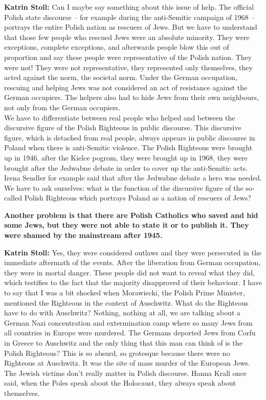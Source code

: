 \textbf{Katrin Stoll:} Can I maybe say something about this issue of help. The official Polish state discourse – for example during the anti-Semitic campaign of 1968 – portrays the entire Polish nation as rescuers of Jews. But we have to understand that those few people who rescued Jews were an absolute minority. They were exceptions, complete exceptions, and afterwards people blow this out of proportion and say these people were representative of the Polish nation. They were not! They were not representative, they represented only themselves, they acted against the norm, the societal norm. Under the German occupation, rescuing and helping Jews was not considered an act of resistance against the German occupiers. The helpers also had to hide Jews from their own neighbours, not only from the German occupiers.\\ 
We have to differentiate between real people who helped and between the discursive figure of the Polish Righteous in public discourse. This discursive figure, which is detached from real people, always appears in public discourse in Poland when there is anti-Semitic violence. The Polish Righteous were brought up in 1946, after the Kielce pogrom, they were brought up in 1968, they were brought after the Jedwabne debate in order to cover up the anti-Semitic acts. Irena Sendler for example said that after the Jedwabne debate a hero was needed. We have to ask ourselves: what is the function of the discursive figure of the so-called Polish Righteous which portrays Poland as a nation of rescuers of Jews? 

\textbf{Another problem is that there are Polish Catholics who saved and hid some Jews, but they were not able to state it or to publish it. They were shamed by the mainstream after 1945.} 

\textbf{Katrin Stoll:} Yes, they were considered outlaws and they were persecuted in the immediate aftermath of the events. After the liberation from German occupation, they were in mortal danger. These people did not want to reveal what they did, which testifies to the fact that the majority disapproved of their behaviour. I have to say that I was a bit shocked when Morawiecki, the Polish Prime Minister, mentioned the Righteous in the context of Auschwitz. What do the Righteous have to do with Auschwitz? Nothing, nothing at all, we are talking about a German Nazi concentration and extermination camp where so many Jews from all countries in Europe were murdered. The Germans deported Jews from Corfu in Greece to Auschwitz and the only thing that this man can think of is the Polish Righteous? This is so absurd, so grotesque because there were no Righteous at Auschwitz. It was the site of mass murder of the European Jews. The Jewish victims don’t really matter in Polish discourse. Hanna Krall once said, when the Poles speak about the Holocaust, they always speak about themselves. 

